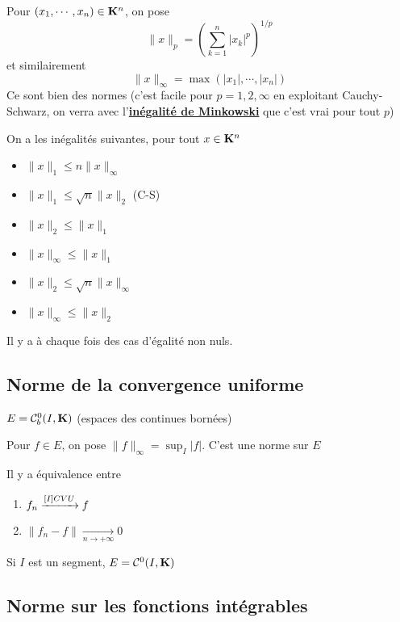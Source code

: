 Pour $(x_1, \cdots , x_n) \in  \mathbf K^n$, on pose \[
    \|x\|_p = \left( \sum_{k=1}^{n} |x_k|^{p} \right) ^{1 / p}
\]
et similairement \[
    \|x\|_\infty = \max(|x_1|, \cdots , |x_n|)
\]
Ce sont bien des normes (c'est facile pour $p = 1, 2, \infty$ en exploitant Cauchy-Schwarz, on verra avec l'\textbf{\hyperref[sec:minkowski-holder]{inégalité de Minkowski}}  que c'est vrai pour tout $p$)

On a les inégalités suivantes, pour tout $x \in  \mathbf K^n$ \begin{itemize}
    \item $\|x\|_1 \leq  n \|x\|_\infty$
    \item $\|x\|_1 \leq  \sqrt{n} \|x\|_2$ (C-S)
    \item $\|x\|_2 \leq  \|x\|_1$
    \item $\|x\|_\infty \leq  \|x\|_1$ 
    \item $\|x\|_2 \leq  \sqrt{ n } \|x\|_\infty$
    \item $\|x\|_\infty \leq  \|x\|_2$
\end{itemize}
Il y a à chaque fois des cas d'égalité non nuls.

\subsection{Norme de la convergence uniforme}

\begin{prop}
    \Hyp $E = \mathcal  C^0_b(I, \mathbf K)$ (espaces des continues bornées)
    \begin{concenum}
    \item Pour $f \in  E$, on pose $\|f\|_\infty = \sup_{I}|f|$. C'est une norme sur $E$
    \item Il y a équivalence entre  \begin{enumerate}
        \item $f_n \xrightarrow{\text[I]{CVU}}f$
        \item  $\|f_n-f\|\xrightarrow[n\to +\infty]{}0$
    \end{enumerate}
    \end{concenum}
\end{prop}

\begin{rem}
    Si $I$ est un segment,  $E=\mathcal  C^0(I, \mathbf K)$
\end{rem}

\subsection{Norme sur les fonctions intégrables}

